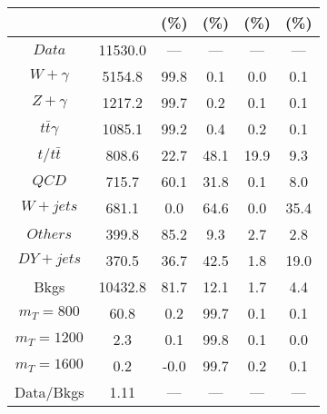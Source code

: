 \begin{figure}
\begin{minipage}[c]{0.32\textwidth}
{\begin{tabular}{cccccc}
 &  & (\%) & (\%) & (\%) & (\%)  \\
\hline
                                                                      $ Data $ &  11530.0 &  --- &  --- &  --- &  ---\\
$ W+\gamma $ &  5154.8 &  99.8 &  0.1 &  0.0 &  0.1\\
$ Z+\gamma $ &  1217.2 &  99.7 &  0.2 &  0.1 &  0.1\\
$ t\bar{t}\gamma $ &  1085.1 &  99.2 &  0.4 &  0.2 &  0.1\\
$ t/t\bar{t} $ &  808.6 &  22.7 &  48.1 &  19.9 &  9.3\\
$ QCD $ &  715.7 &  60.1 &  31.8 &  0.1 &  8.0\\
$ W+jets $ &  681.1 &  0.0 &  64.6 &  0.0 &  35.4\\
$ Others $ &  399.8 &  85.2 &  9.3 &  2.7 &  2.8\\
$ DY+jets $ &  370.5 &  36.7 &  42.5 &  1.8 &  19.0\\
Bkgs &  10432.8 &  81.7 &  12.1 &  1.7 &  4.4\\
$ m_{T} = 800 $ &  60.8 &  0.2 &  99.7 &  0.1 &  0.1\\
$ m_{T} = 1200 $ &  2.3 &  0.1 &  99.8 &  0.1 &  0.0\\
$ m_{T} = 1600 $ &  0.2 &  -0.0 &  99.7 &  0.2 &  0.1\\
Data/Bkgs &  1.11 &  --- &  --- &  --- &  ---\\
\hline
\end{tabular}
}
\end{minipage}
\end{figure}

